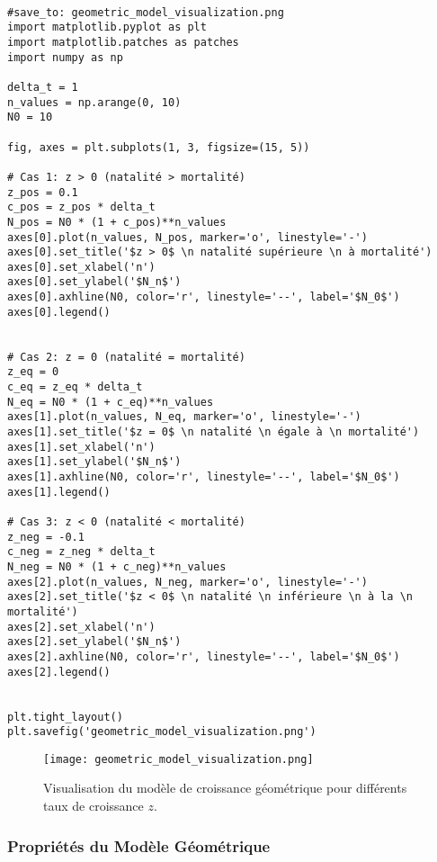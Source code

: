 \documentclass[oneside]{book}
\begin{document}
\begin{verbatim}

#save_to: geometric_model_visualization.png
import matplotlib.pyplot as plt
import matplotlib.patches as patches
import numpy as np

delta_t = 1
n_values = np.arange(0, 10)
N0 = 10

fig, axes = plt.subplots(1, 3, figsize=(15, 5))

# Cas 1: z > 0 (natalité > mortalité)
z_pos = 0.1
c_pos = z_pos * delta_t
N_pos = N0 * (1 + c_pos)**n_values
axes[0].plot(n_values, N_pos, marker='o', linestyle='-')
axes[0].set_title('$z > 0$ \n natalité supérieure \n à mortalité')
axes[0].set_xlabel('n')
axes[0].set_ylabel('$N_n$')
axes[0].axhline(N0, color='r', linestyle='--', label='$N_0$')
axes[0].legend()


# Cas 2: z = 0 (natalité = mortalité)
z_eq = 0
c_eq = z_eq * delta_t
N_eq = N0 * (1 + c_eq)**n_values
axes[1].plot(n_values, N_eq, marker='o', linestyle='-')
axes[1].set_title('$z = 0$ \n natalité \n égale à \n mortalité')
axes[1].set_xlabel('n')
axes[1].set_ylabel('$N_n$')
axes[1].axhline(N0, color='r', linestyle='--', label='$N_0$')
axes[1].legend()

# Cas 3: z < 0 (natalité < mortalité)
z_neg = -0.1
c_neg = z_neg * delta_t
N_neg = N0 * (1 + c_neg)**n_values
axes[2].plot(n_values, N_neg, marker='o', linestyle='-')
axes[2].set_title('$z < 0$ \n natalité \n inférieure \n à la \n mortalité')
axes[2].set_xlabel('n')
axes[2].set_ylabel('$N_n$')
axes[2].axhline(N0, color='r', linestyle='--', label='$N_0$')
axes[2].legend()


plt.tight_layout()
plt.savefig('geometric_model_visualization.png')
\end{verbatim}

\begin{figure}[h]
    \centering
    \texttt{[image: geometric\_model\_visualization.png]}
    \caption{Visualisation du modèle de croissance géométrique pour différents taux de croissance $z$.}
    \label{fig:geometric_model_visualization}
\end{figure}


\subsubsection{Propriétés du Modèle Géométrique}
\end{document}
